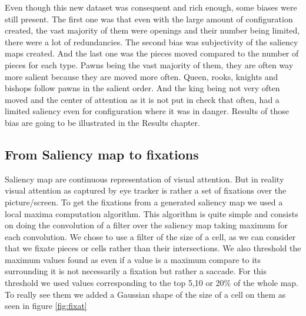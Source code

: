Even though this new dataset was consequent and rich enough, some biases were still present.
The first one was that even with the large amount of configuration created, the vast majority of them were openings and their number being limited, there were a lot of redundancies.
The second bias was subjectivity of the saliency maps created. And the last one was the pieces moved compared to the number of pieces for each type. Pawns being the vast majority of them, they are often way more salient because they are  moved more often. Queen, rooks, knights and bishops follow pawns in the salient order. And the king being not very often moved and the center of attention as it is not put in check that often, had a limited saliency even for configuration where it was in danger.
Results of those bias are going to be illustrated in the Results chapter.

\subsection{From Saliency map to fixations}
Saliency map are continuous representation of visual attention. But in reality visual attention as captured by eye tracker is rather a set of fixations over the picture/screen. To get the fixations from a generated saliency map we used a local maxima computation algorithm. This algorithm is quite simple and consists on doing the convolution of a filter over the saliency map taking maximum for each convolution.
We chose to use a filter of the size of a cell, as we can consider that we fixate pieces or cells rather than their intersections. We also threshold the maximum values found as even if a value is a maximum compare to its surrounding it is not necessarily a fixation but rather a saccade. For this threshold we used values corresponding to the top 5,10 or 20\% of the whole map. To really see them we added a Gaussian shape of the size of a cell on them as seen in figure \ref{fig:fixat}

